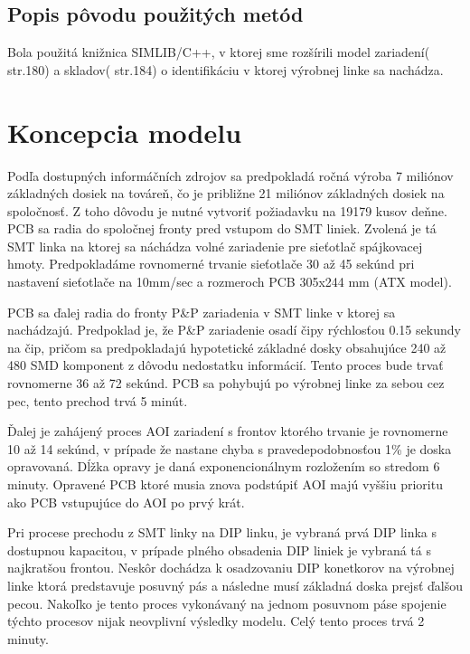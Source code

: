 \documentclass[12pt,a4paper,titlepage,final]{article}
\begin{document}
\subsection{Popis pôvodu použitých metód}
Bola použitá knižnica SIMLIB/C++, v ktorej sme rozšírili model zariadení(\cite{peringer-slidy} str.180) a 
skladov(\cite{peringer-slidy} str.184) o identifikáciu v ktorej výrobnej linke sa nachádza.

\section{Koncepcia modelu}
Podľa dostupných informáčních zdrojov sa predpokladá ročná výroba 7 miliónov
základných dosiek na továreň, čo je približne 21 miliónov základných dosiek
na spoločnosť\cite{gigabyte-sprava}. Z toho dôvodu je nutné vytvoriť požiadavku na 19179 kusov deňne.
PCB sa radia do spoločnej fronty pred vstupom do SMT liniek. Zvolená je tá SMT
linka na ktorej sa náchádza volné zariadenie pre sieťotlač spájkovacej hmoty.
Predpokladáme rovnomerné trvanie sieťotlače 30 až 45 sekúnd pri nastavení sieťotlače
na 10mm/sec a rozmeroch PCB 305x244 mm (ATX model)\cite{ATX}.

PCB sa ďalej radia do fronty P\&P zariadenia v SMT linke v ktorej sa nachádzajú.
Predpoklad je, že P\&P zariadenie osadí čipy rýchlosťou 0.15 sekundy na čip, pričom
sa predpokladajú hypotetické základné dosky obsahujúce 240 až 480 SMD komponent
z dôvodu nedostatku informácií. Tento proces bude trvať rovnomerne 36 až 72 sekúnd.
PCB sa pohybujú po výrobnej linke za sebou cez pec, tento prechod trvá 5 minút.

Ďalej je zahájený proces AOI zariadení s frontov ktorého trvanie je rovnomerne 10 až 14 sekúnd, v 
prípade že nastane chyba s pravedepodobnosťou 1\% je doska opravovaná. Dĺžka
opravy je daná exponencionálnym rozložením so stredom 6 minuty. Opravené PCB
ktoré musia znova podstúpiť AOI majú vyššiu prioritu ako PCB vstupujúce do AOI 
po prvý krát.

Pri procese prechodu z SMT linky na DIP linku, je vybraná prvá DIP linka s dostupnou
kapacitou, v prípade plného obsadenia DIP liniek je vybraná tá s najkratšou
frontou. Neskôr dochádza k osadzovaniu DIP konetkorov na výrobnej linke
ktorá predstavuje posuvný pás a následne musí základná doska prejsť ďalšou
pecou. Nakoľko je tento proces vykonávaný na jednom posuvnom páse spojenie týchto
procesov nijak neovplivní výsledky modelu. Celý tento proces trvá 2 minuty.
\end{document}
